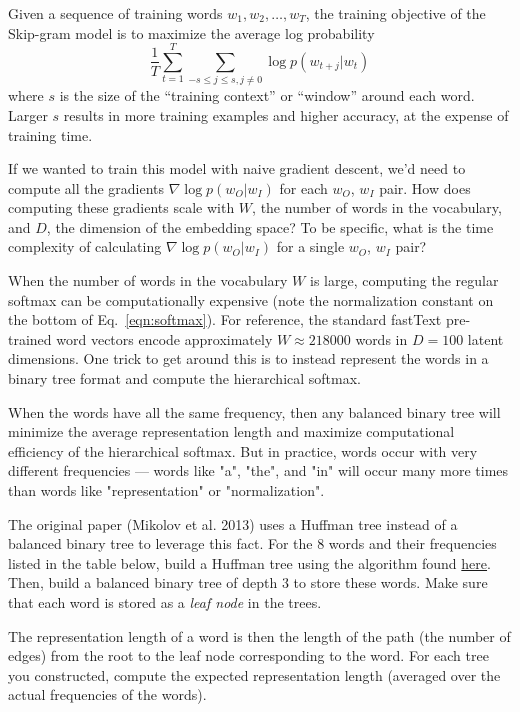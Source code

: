 Given a sequence of training words $w_1, w_2, \hdots, w_T$, the training objective of the Skip-gram model is to maximize the average log probability
\[ \frac{1}{T}  \sum_{t=1}^T \sum_{-s \leq j \leq s, j \neq 0} \log p(w_{t+j}|w_t) \tag{1}\label{eqn:opt} \] where $s$ is the size of the ``training context'' or ``window'' around each word. Larger $s$ results in more training examples and higher accuracy, at the expense of training time.

\problem[5]
If we wanted to train this model with naive gradient descent, we'd need to compute all the gradients $\nabla \log p(w_O|w_I)$ for each $w_O$, $w_I$ pair.  How does computing these gradients scale with $W$, the number of words in the vocabulary, and $D$, the dimension of the embedding space? To be specific, what is the time complexity of calculating $\nabla \log p(w_O|w_I)$ for a single $w_O$, $w_I$ pair?

\begin{solution}



\end{solution}


\problem[10]
When the number of words in the vocabulary $W$ is large, computing the regular softmax can be computationally expensive (note the normalization constant on the bottom of Eq.~\ref{eqn:softmax}). For reference, the standard fastText pre-trained word vectors encode approximately $W \approx 218000$ words in $D=100$ latent dimensions. One trick to get around this is to instead represent the words in a binary tree format and compute the hierarchical softmax.

When the words have all the same frequency, then any balanced binary tree will minimize the average representation length and maximize computational efficiency of the hierarchical softmax. But in practice, words occur with very different frequencies --- words like "a", "the", and "in" will occur many more times than words like "representation" or "normalization".

The original paper (Mikolov et al. 2013) uses a Huffman tree instead of a balanced binary tree to leverage this fact. For the 8 words and their frequencies listed in the table below, build a Huffman tree using the algorithm found \href{https://riptutorial.com/algorithm/example/23995/huffman-coding}{here}.
Then, build a balanced binary tree of depth 3 to store these words. 
Make sure that each word is stored as a \emph{leaf node} in the trees.

The representation length of a word is then the length of the path (the number of edges) from the root to the leaf node corresponding to the word. For each tree you constructed, compute the expected representation length (averaged over the actual frequencies of the words).

